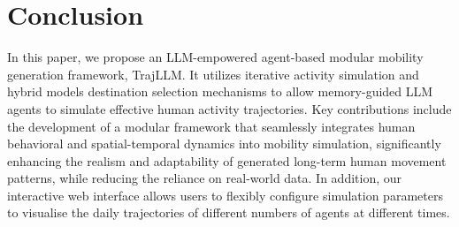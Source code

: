 \section{Conclusion}
In this paper, we propose an LLM-empowered agent-based modular mobility generation framework, TrajLLM. It utilizes iterative activity simulation and hybrid models destination selection mechanisms to allow memory-guided LLM agents to simulate effective human activity trajectories. Key contributions include the development of a modular framework that seamlessly integrates human behavioral and spatial-temporal dynamics into mobility simulation, significantly enhancing the realism and adaptability of generated long-term human movement patterns, while reducing the reliance on real-world data. 
In addition, our interactive web interface allows users to flexibly configure simulation parameters to visualise the daily trajectories of different numbers of agents at different times.
